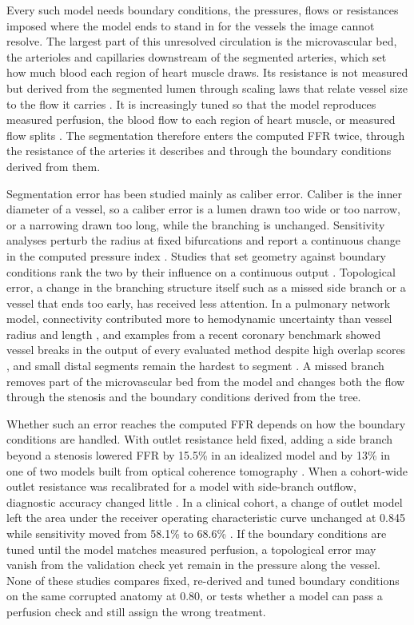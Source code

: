 \documentclass[journal]{IEEEtran}
\begin{document}
Every such model needs boundary conditions, the pressures, flows or resistances imposed where the model ends to stand in for the vessels the image cannot resolve. The largest part of this unresolved circulation is the
microvascular bed, the arterioles and capillaries downstream of the segmented arteries, which set how much blood
each region of heart muscle draws. Its resistance is not measured but derived from the segmented lumen through
scaling laws that relate vessel size to the flow it carries \cite{murray1926,kim2010}. It is increasingly tuned so that the model reproduces measured perfusion, the blood flow to each region of heart
muscle, or measured flow splits \cite{menon2024,arminio2026}. The segmentation therefore enters the computed FFR twice, through the resistance of the arteries it describes and through the boundary conditions derived from them.

Segmentation error has been studied mainly as caliber error. Caliber is the inner diameter of a vessel, so a caliber error is a lumen drawn too wide or too narrow, or a narrowing drawn too long, while the branching is unchanged. Sensitivity analyses perturb the radius at fixed bifurcations and report a continuous change in the computed pressure index \cite{sankaran2015tmi,sankaran2015cmame,fernandez2024,dalmaso2025}. Studies that set geometry against
boundary conditions rank the two by their influence on a continuous output \cite{sankaran2016,tanade2022,korte2023}. Topological error, a change in the branching structure itself such as a missed side branch or a vessel that ends too early, has received less attention. In a pulmonary network model, connectivity contributed more to hemodynamic uncertainty than vessel radius and
length \cite{colebank2019}, and examples from a recent coronary benchmark showed vessel breaks in the output of every evaluated method despite high overlap scores \cite{bransby2026}, and small distal segments remain the hardest to segment
\cite{chen2025}. A missed branch removes part of the microvascular bed from the model and changes both the flow
through the stenosis and the boundary conditions derived from the tree.

Whether such an error reaches the computed FFR depends on how the boundary conditions are handled. With outlet resistance held fixed, adding a side branch beyond a stenosis lowered FFR by 15.5\% in an idealized model and by 13\% in one of two models built from optical coherence tomography \cite{gamage2022}. When a cohort-wide outlet resistance was recalibrated for a model with side-branch outflow, diagnostic accuracy changed little \cite{gosling2020}. In a clinical cohort, a change of outlet
model left the area under the receiver operating characteristic curve unchanged at 0.845 while sensitivity moved
from 58.1\% to 68.6\% \cite{fossan2026}. If the boundary conditions are tuned until the model matches measured perfusion, a topological error may vanish
from the validation check yet remain in the pressure along the vessel. None of these studies compares fixed, re-derived and tuned boundary conditions on the same corrupted anatomy at
0.80, or tests whether a model can pass a perfusion check and still assign the wrong treatment.
\end{document}
